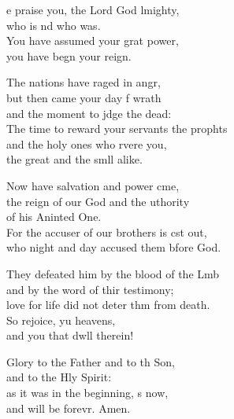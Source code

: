 \settowidth{\versewidth}{The time to reward your servants the prophets +}
\begin{psalmverse}%
  \begin{patverse}
e praise you, the Lord God lmighty,\Med\\
who is nd who was.\\
You have assumed your grat power,\Med\\
you have begn your reign.

The nations have raged in angr,\Flex\\
but then came your day f wrath\Med\\
and the moment to jdge the dead:\\
The time to reward your servants the prophts\Flex\\
and the holy ones who rvere you,\Med\\
the great and the smll alike.

Now have salvation and power cme,\Flex\\
the reign of our God and the uthority\Med\\
of his Aninted One.\\
For the accuser of our brothers is cst out,\Med\\
who night and day accused them bfore God.

They defeated him by the blood of the Lmb\Flex\\
and by the word of thir testimony;\Med\\
love for life did not deter thm from death.\\
So rejoice, yu heavens,\Med\\
and you that dwll therein!

Glory to the Father and to th Son,\Med\\
and to the Hly Spirit:\\
as it was in the beginning, s now,\Med\\
and will be forevr. Amen. 
  \end{patverse}
\end{psalmverse}
